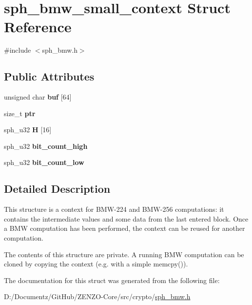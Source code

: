 \hypertarget{structsph__bmw__small__context}{}\section{sph\+\_\+bmw\+\_\+small\+\_\+context Struct Reference}
\label{structsph__bmw__small__context}


{\ttfamily \#include $<$sph\+\_\+bmw.\+h$>$}

\subsection*{Public Attributes}
\begin{DoxyCompactItemize}
\item 
\mbox{\label{structsph__bmw__small__context_a5f1580ed6522ddbb529017d3ba68e7b5}} 
unsigned char {\bfseries buf} \mbox{[}64\mbox{]}
\item 
\mbox{\label{structsph__bmw__small__context_ac3a10222d190e8421416d19330dc3629}} 
size\+\_\+t {\bfseries ptr}
\item 
\mbox{\label{structsph__bmw__small__context_a764567f1e5b6b3e8f9b14d87735ea4d8}} 
sph\+\_\+u32 {\bfseries H} \mbox{[}16\mbox{]}
\item 
\mbox{\label{structsph__bmw__small__context_a97ea70c252613bc1c1b41a862c8368ac}} 
sph\+\_\+u32 {\bfseries bit\+\_\+count\+\_\+high}
\item 
\mbox{\label{structsph__bmw__small__context_a1f4f38d96781dea1579d0e3320fa8968}} 
sph\+\_\+u32 {\bfseries bit\+\_\+count\+\_\+low}
\end{DoxyCompactItemize}


\subsection{Detailed Description}
This structure is a context for B\+M\+W-\/224 and B\+M\+W-\/256 computations\+: it contains the intermediate values and some data from the last entered block. Once a B\+MW computation has been performed, the context can be reused for another computation.

The contents of this structure are private. A running B\+MW computation can be cloned by copying the context (e.\+g. with a simple {\ttfamily memcpy()}). 

The documentation for this struct was generated from the following file\+:\begin{DoxyCompactItemize}
\item 
D\+:/\+Documentz/\+Git\+Hub/\+Z\+E\+N\+Z\+O-\/\+Core/src/crypto/\mbox{\hyperlink{sph__bmw_8h}{sph\+\_\+bmw.\+h}}\end{DoxyCompactItemize}
